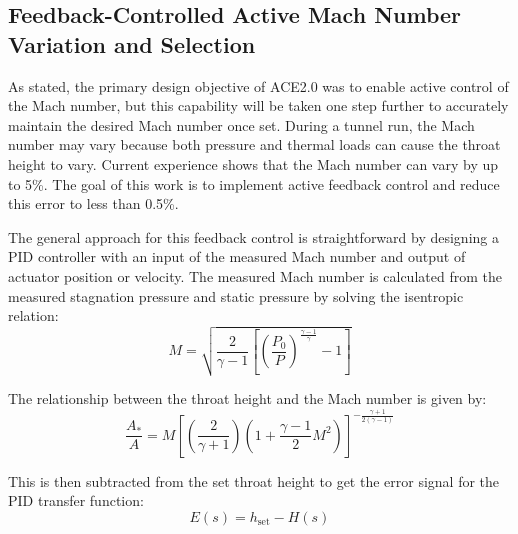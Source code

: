 \subsection{Feedback-Controlled Active Mach Number Variation and Selection}

As stated, the primary design objective of ACE2.0 was to enable active control of the Mach number, but this capability will be taken one step further to accurately maintain the desired Mach number once set. During a tunnel run, the Mach number may vary because both pressure and thermal loads can cause the throat height to vary. Current experience shows that the Mach number can vary by up to 5\%. The goal of this work is to implement active feedback control and reduce this error to less than 0.5\%.

The general approach for this feedback control is straightforward by designing a PID controller with an input of the measured Mach number and output of actuator position or velocity. The measured Mach number is calculated from the measured stagnation pressure and static pressure by solving the isentropic relation:
\begin{equation} 
    M = \sqrt{\frac{2}{\gamma - 1} \left[\left(\frac{P_0}{P}\right)^{\frac{\gamma - 1}{\gamma}} - 1\right]}
\end{equation}

\noindent The relationship between the throat height and the Mach number is given by:
\begin{equation}
    \frac{A_*}{A} = M \left[ \left( \frac{2}{\gamma+1}  \right) \left( 1 + \frac{\gamma-1}{2} M^2  \right) \right]^{-\frac{\gamma+1}{2(\gamma-1)} }
\end{equation}

\noindent This is then subtracted from the set throat height to get the error signal for the PID transfer function:
\begin{equation}
    E(s) = h_{\mathrm{set}} - H(s)
\end{equation}

